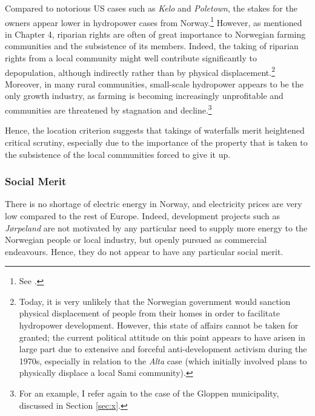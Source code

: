 Compared to notorious US cases such as {\it Kelo} and {\it Poletown}, the stakes for the owners appear lower in hydropower cases from Norway.\footnote{See \cite{poletown81,kelo05}.} However, as mentioned in Chapter 4, riparian rights are often of great importance to Norwegian farming communities and the subsistence of its members. Indeed, the taking of riparian rights from a local community might well contribute significantly to depopulation, although indirectly rather than by physical displacement.\footnote{Today, it is very unlikely that the Norwegian government would sanction physical displacement of people from their homes in order to facilitate hydropower development. However, this state of affairs cannot be taken for granted; the current political attitude on this point appears to have arisen in large part due to extensive and forceful anti-development activism during the 1970s, especially in relation to the {\it Alta} case (which initially involved plans to physically displace a local Sami community).} Moreover, in many rural communities, small-scale hydropower appears to be the only growth industry, as farming is becoming increasingly unprofitable and communities are threatened by stagnation and decline.\footnote{For an example, I refer again to the case of the Gloppen municipality, discussed in Section \ref{sec:x}.}

Hence, the location criterion suggests that takings of waterfalls merit heightened critical scrutiny, especially due to the importance of the property that is taken to the subsistence of the local communities forced to give it up.

\subsubsection{Social Merit}


There is no shortage of electric energy in Norway, and electricity prices are very low compared to the rest of Europe. Indeed, development projects such as {\it Jørpeland} are not motivated by any particular need to supply more energy to the Norwegian people or local industry, but openly pursued as commercial endeavours. Hence, they do not appear to have any particular social merit.

